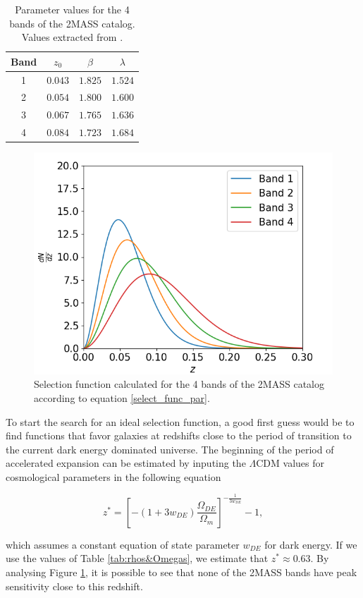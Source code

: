 \documentclass[openany,a4paper,12pt,oneside]{book}
\begin{document}
\begin{spacing}{1.5}
\begin{table}[!htb]
\centering
    \begin{tabular}{cccc} \hline
     Band & $z_0$ & $\beta$ & $\lambda$ \\ \hline
     1 & $0.043$ & $1.825$ & $1.524$\\
     2 & $0.054$ & $1.800$ & $1.600$ \\
     3 & $0.067$ & $1.765$ & $1.636$\\
     4 & $0.084$ & $1.723$ & $1.684$\\ \hline
    \end{tabular}
    \caption{Parameter values for the 4 bands of the 2MASS catalog. Values extracted from \cite{cross_corr:Afshordi}.}
    \label{tab:bands_2MASS}
\end{table}

\begin{figure}[!htb]
	\centering
	\includegraphics[width=.7\linewidth]{Imagens/selection_2MASS.png}
	\caption{Selection function calculated for the 4 bands of the 2MASS catalog according to equation \eqref{select_func_par}.}
	\label{fig:2MASS_selections}
\end{figure}

To start the search for an ideal selection function, a good first guess would be to find functions that favor galaxies at redshifts close to the period of transition to the current dark energy dominated universe. The beginning of the period of accelerated expansion can be estimated by inputing the $\Lambda$CDM values for cosmological parameters in the following equation

\begin{equation}\label{dark_energy_era_redshift}
	z^*=\left[-(1+3w_{DE})\frac{\Omega_{DE}}{\Omega_m}\right]^{-\frac{1}{3w_{DE}}}-1,
\end{equation}

\noindent which assumes a constant equation of state parameter $w_{DE}$ for dark energy\cite{dark_energy_era}. If we use the values of Table \ref{tab:rhos&Omegas}, we estimate that $z^*\approx 0.63$. By analysing Figure \ref{fig:2MASS_selections}, it is possible to see that none of the 2MASS bands have peak sensitivity close to this redshift.


\end{spacing}
\end{document}
